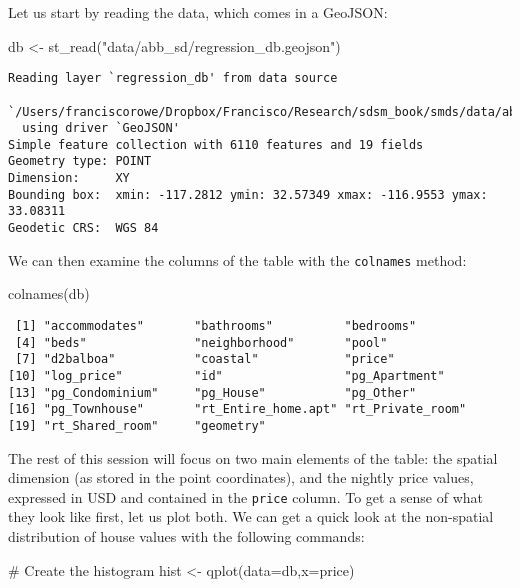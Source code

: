 \documentclass[
  letterpaper,
  krantz2]{style/krantz}
\newenvironment{Shaded}{\begin{snugshade}}{\end{snugshade}}
\newcommand{\AttributeTok}[1]{\textcolor[rgb]{0.40,0.45,0.13}{#1}}
\newcommand{\CommentTok}[1]{\textcolor[rgb]{0.37,0.37,0.37}{#1}}
\newcommand{\FunctionTok}[1]{\textcolor[rgb]{0.28,0.35,0.67}{#1}}
\newcommand{\NormalTok}[1]{\textcolor[rgb]{0.00,0.23,0.31}{#1}}
\newcommand{\OtherTok}[1]{\textcolor[rgb]{0.00,0.23,0.31}{#1}}
\newcommand{\StringTok}[1]{\textcolor[rgb]{0.13,0.47,0.30}{#1}}
\begin{document}
Let us start by reading the data, which comes in a GeoJSON:

\begin{Shaded}
\begin{Highlighting}[]
\NormalTok{db }\OtherTok{\textless{}{-}} \FunctionTok{st\_read}\NormalTok{(}\StringTok{"data/abb\_sd/regression\_db.geojson"}\NormalTok{)}
\end{Highlighting}
\end{Shaded}

\begin{verbatim}
Reading layer `regression_db' from data source 
  `/Users/franciscorowe/Dropbox/Francisco/Research/sdsm_book/smds/data/abb_sd/regression_db.geojson' 
  using driver `GeoJSON'
Simple feature collection with 6110 features and 19 fields
Geometry type: POINT
Dimension:     XY
Bounding box:  xmin: -117.2812 ymin: 32.57349 xmax: -116.9553 ymax: 33.08311
Geodetic CRS:  WGS 84
\end{verbatim}

We can then examine the columns of the table with the \texttt{colnames}
method:

\begin{Shaded}
\begin{Highlighting}[]
\FunctionTok{colnames}\NormalTok{(db)}
\end{Highlighting}
\end{Shaded}

\begin{verbatim}
 [1] "accommodates"       "bathrooms"          "bedrooms"          
 [4] "beds"               "neighborhood"       "pool"              
 [7] "d2balboa"           "coastal"            "price"             
[10] "log_price"          "id"                 "pg_Apartment"      
[13] "pg_Condominium"     "pg_House"           "pg_Other"          
[16] "pg_Townhouse"       "rt_Entire_home.apt" "rt_Private_room"   
[19] "rt_Shared_room"     "geometry"          
\end{verbatim}

The rest of this session will focus on two main elements of the table:
the spatial dimension (as stored in the point coordinates), and the
nightly price values, expressed in USD and contained in the
\texttt{price} column. To get a sense of what they look like first, let
us plot both. We can get a quick look at the non-spatial distribution of
house values with the following commands:

\begin{Shaded}
\begin{Highlighting}[]
\CommentTok{\# Create the histogram}
\NormalTok{hist }\OtherTok{\textless{}{-}} \FunctionTok{qplot}\NormalTok{(}\AttributeTok{data=}\NormalTok{db,}\AttributeTok{x=}\NormalTok{price)}
\end{Highlighting}
\end{Shaded}
\end{document}
